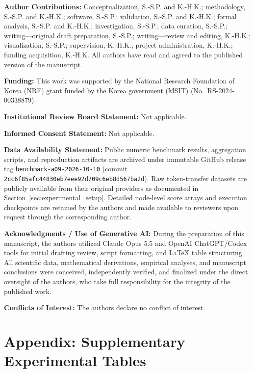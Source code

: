 \documentclass[11pt,a4paper]{article}
\newcommand{\authorcontributions}[1]{\par\medskip\noindent\textbf{Author Contributions: }#1}
\newcommand{\funding}[1]{\par\smallskip\noindent\textbf{Funding: }#1}
\newcommand{\institutionalreview}[1]{\par\smallskip\noindent\textbf{Institutional Review Board Statement: }#1}
\newcommand{\informedconsent}[1]{\par\smallskip\noindent\textbf{Informed Consent Statement: }#1}
\newcommand{\dataavailability}[1]{\par\smallskip\noindent\textbf{Data Availability Statement: }#1}
\newcommand{\conflictsofinterest}[1]{\par\smallskip\noindent\textbf{Conflicts of Interest: }#1}
\begin{document}
\authorcontributions{Conceptualization, S.-S.P. and K.-H.K.; methodology, S.-S.P. and K.-H.K.; software, S.-S.P.; validation, S.-S.P. and K.-H.K.; formal analysis, S.-S.P. and K.-H.K.; investigation, S.-S.P.; data curation, S.-S.P.; writing---original draft preparation, S.-S.P.; writing---review and editing, K.-H.K.; visualization, S.-S.P.; supervision, K.-H.K.; project administration, K.-H.K.; funding acquisition, K.-H.K. All authors have read and agreed to the published version of the manuscript.}

\funding{This work was supported by the National Research Foundation of Korea (NRF) grant funded by the Korea government (MSIT) (No.~RS-2024-00338879).}

\institutionalreview{Not applicable.}

\informedconsent{Not applicable.}

\dataavailability{Public numeric benchmark results, aggregation scripts, and reproduction artifacts are archived under immutable GitHub release tag \texttt{benchmark-a09-}\allowbreak\texttt{2026-10-10} (commit \texttt{2cc6f85afc44830eb7eee92d709c6eb8d567ba2d}). Raw token-transfer datasets are publicly available from their original providers as documented in Section~\ref{sec:experimental_setup}. Detailed node-level score arrays and execution checkpoints are retained by the authors and made available to reviewers upon request through the corresponding author.}

\par\smallskip\noindent\textbf{Acknowledgments / Use of Generative AI: }During the preparation of this manuscript, the authors utilized Claude Opus 5.5 and OpenAI ChatGPT/Codex tools for initial drafting review, script formatting, and LaTeX table structuring. All scientific data, mathematical derivations, empirical analyses, and manuscript conclusions were conceived, independently verified, and finalized under the direct oversight of the authors, who take full responsibility for the integrity of the published work.

\conflictsofinterest{The authors declare no conflict of interest.}




\newpage
\appendix
\section*{Appendix: Supplementary Experimental Tables}
\label{sec:appendix}
\end{document}
